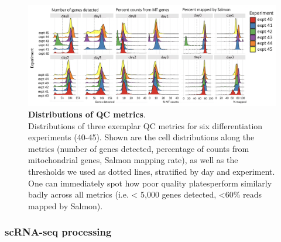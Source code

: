 \begin{figure}[h]
\centering
\includegraphics[width=16cm]{Chapter4/Fig/endodiff_qc_examples.png}
\caption[Distributions of QC metrics]{\textbf{Distributions of QC metrics}.\\
Distributions of three exemplar QC metrics for six differentiation experiments (40-45).
Shown are the cell distributions along the metrics (number of genes detected, percentage of counts from mitochondrial genes, Salmon \cite{patro2017salmon} mapping rate), as well as the thresholds we used as dotted lines, stratified by day and experiment.
One can immediately spot how poor quality plates\footnotemark  perform similarly badly across all metrics (i.e. < 5,000 genes detected, <60\% reads mapped by Salmon).}
\label{fig:endodiff_qc_distributions}
\end{figure}

\subsubsection{scRNA-seq processing}

